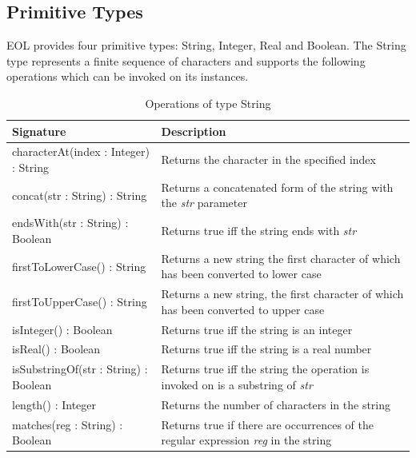 \subsection{Primitive Types} 

EOL provides four primitive types: String, Integer, Real and Boolean. The String type represents a finite sequence of characters and supports the following operations which can be invoked on its instances.
\clearpage
\begin{longtabu} {|p{6.5cm}|X|}
\caption{Operations of type String}
\label{tab:StringOperations}\\
\hline 
    \textbf{Signature} & \textbf{Description} \\\hline
    characterAt(index : Integer) : String & Returns the character in the specified index\\\hline
    
    concat(str : String) : String & Returns a concatenated form of the string with the \emph{str} parameter\\\hline
    
    endsWith(str : String) : Boolean & Returns true iff the string ends with \emph{str}\\\hline
    
    firstToLowerCase() : String & Returns a new string the first character of which has been converted to lower case \\\hline
    
    firstToUpperCase() : String & Returns a new string, the first character of which has been converted to upper case \\\hline
    
    isInteger() : Boolean & Returns true iff the string is an integer\\\hline
    
    isReal() : Boolean & Returns true iff the string is a real number\\\hline
    
    isSubstringOf(str : String) : Boolean & Returns true iff the string the operation is invoked on is a substring of \emph{str} \\\hline
    
    length() : Integer & Returns the number of characters in the string \\\hline
    
    matches(reg : String) : Boolean & Returns true if there are occurrences of the regular expression \emph{reg} in the string\\\hline
    

\end{longtabu}
